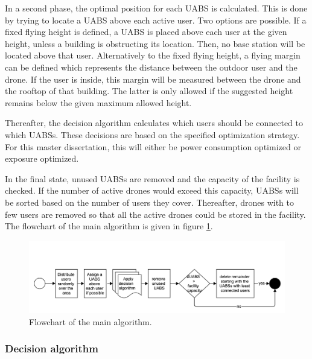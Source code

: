 In a second phase, the optimal position for each \gls{UABS} is calculated. This is done by trying to locate a \gls{UABS} above each active user. Two options are possible.
If a fixed flying height is defined, a \gls{UABS} is placed above each user at the given height, unless a building is obstructing its location. Then, no base station will be located above that user.
Alternatively to the fixed flying height, a flying margin can be defined which represents the distance between the outdoor user and  the drone.
If the user is inside, this margin will be measured between the drone and the rooftop of that building.
The latter is only allowed if the suggested height remains below the given maximum allowed height.

Thereafter, the decision algorithm calculates which users should be connected to which \gls{UABS}s. 
These decisions are based on the specified optimization strategy. For this master dissertation,
this will either be power consumption optimized or exposure optimized.

In the final state, unused \gls{UABS}s are removed and the capacity of the facility is checked. 
If the number of active drones would exceed this capacity, \gls{UABS}s will be sorted based on the number of 
users they cover. Thereafter, drones with to few users are removed so that all the active drones could be stored in the facility.
The flowchart of the main algorithm is given in figure \ref{fig:mainflow}.
\begin{figure}[h!]
\centering
 \includegraphics[width=\textwidth]{../images/mainflow.png}
  \caption{Flowchart of the main algorithm.}
  \label{fig:mainflow}
\end{figure}

\subsubsection{Decision algorithm}

